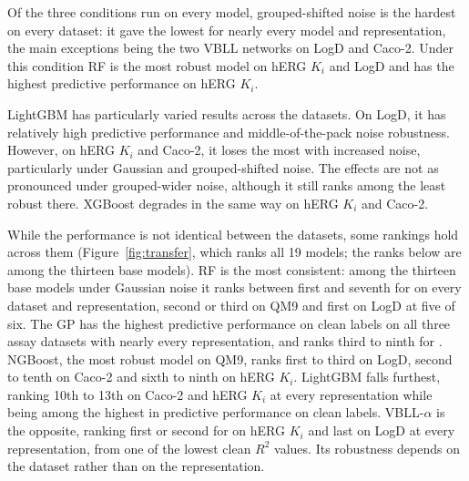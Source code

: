 Of the three conditions run on every model, grouped-shifted noise is the hardest on every dataset: it gave the lowest \aucnorm{} for nearly every model and representation, the main exceptions being the two VBLL networks on LogD and Caco-2. Under this condition RF is the most robust model on hERG $K_i$ and LogD and has the highest predictive performance on hERG $K_i$.

LightGBM has particularly varied results across the datasets. On LogD, it has relatively high predictive performance and middle-of-the-pack noise robustness. However, on hERG $K_i$ and Caco-2, it loses the most with increased noise, particularly under Gaussian and grouped-shifted noise. The effects are not as pronounced under grouped-wider noise, although it still ranks among the least robust there. XGBoost degrades in the same way on hERG $K_i$ and Caco-2.

While the performance is not identical between the datasets, some rankings hold across them (Figure~\ref{fig:transfer}, which ranks all 19 models; the ranks below are among the thirteen base models). RF is the most consistent: among the thirteen base models under Gaussian noise it ranks between first and seventh for \aucnorm{} on every dataset and representation, second or third on QM9 and first on LogD at five of six. The GP has the highest predictive performance on clean labels on all three assay datasets with nearly every representation, and ranks third to ninth for \aucnorm. NGBoost, the most robust model on QM9, ranks first to third on LogD, second to tenth on Caco-2 and sixth to ninth on hERG $K_i$. LightGBM falls furthest, ranking 10th to 13th on Caco-2 and hERG $K_i$ at every representation while being among the highest in predictive performance on clean labels. VBLL-$\alpha$ is the opposite, ranking first or second for \aucnorm{} on hERG $K_i$ and last on LogD at every representation, from one of the lowest clean $R^2$ values. Its robustness depends on the dataset rather than on the representation.

